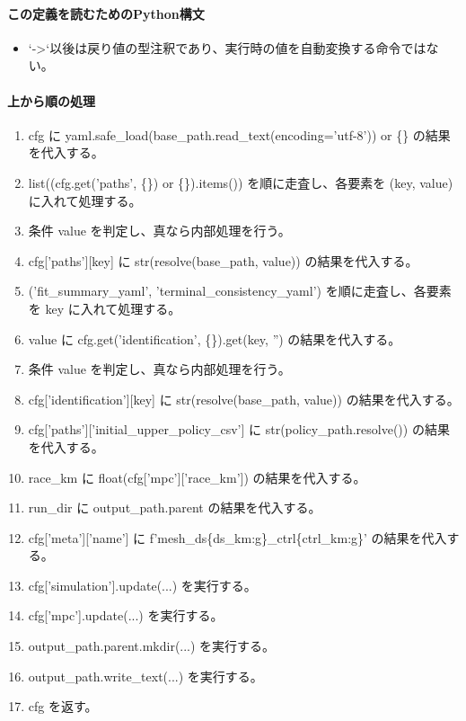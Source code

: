 \documentclass[a4paper,11pt]{article}
\begin{document}
            \paragraph{この定義を読むためのPython構文}
            \begin{itemize}[leftmargin=1.6em]
            \item `->`以後は戻り値の型注釈であり、実行時の値を自動変換する命令ではない。
            \end{itemize}
            \paragraph{上から順の処理}
            \begin{enumerate}[leftmargin=1.8em]
            \item cfg に yaml.safe\_load(base\_path.read\_text(encoding='utf-8')) or \{\} の結果を代入する。
\item list((cfg.get('paths', \{\}) or \{\}).items()) を順に走査し、各要素を (key, value) に入れて処理する。
\item   条件 value を判定し、真なら内部処理を行う。
\item     cfg['paths'][key] に str(resolve(base\_path, value)) の結果を代入する。
\item ('fit\_summary\_yaml', 'terminal\_consistency\_yaml') を順に走査し、各要素を key に入れて処理する。
\item   value に cfg.get('identification', \{\}).get(key, '') の結果を代入する。
\item   条件 value を判定し、真なら内部処理を行う。
\item     cfg['identification'][key] に str(resolve(base\_path, value)) の結果を代入する。
\item cfg['paths']['initial\_upper\_policy\_csv'] に str(policy\_path.resolve()) の結果を代入する。
\item race\_km に float(cfg['mpc']['race\_km']) の結果を代入する。
\item run\_dir に output\_path.parent の結果を代入する。
\item cfg['meta']['name'] に f'mesh\_ds\{ds\_km:g\}\_ctrl\{ctrl\_km:g\}' の結果を代入する。
\item cfg['simulation'].update(...) を実行する。
\item cfg['mpc'].update(...) を実行する。
\item output\_path.parent.mkdir(...) を実行する。
\item output\_path.write\_text(...) を実行する。
\item cfg を返す。
            \end{enumerate}
\end{document}
